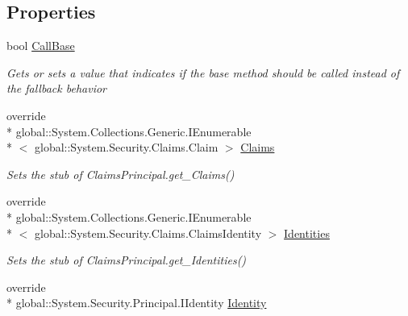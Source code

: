 \subsection*{Properties}
\begin{DoxyCompactItemize}
\item 
bool \hyperlink{class_system_1_1_security_1_1_principal_1_1_fakes_1_1_stub_generic_principal_a1cc5d2a168bacab0838acd6a0ab4c05a}{Call\-Base}
\begin{DoxyCompactList}\small\item\em Gets or sets a value that indicates if the base method should be called instead of the fallback behavior\end{DoxyCompactList}\item 
override \\*
global\-::\-System.\-Collections.\-Generic.\-I\-Enumerable\\*
$<$ global\-::\-System.\-Security.\-Claims.\-Claim $>$ \hyperlink{class_system_1_1_security_1_1_principal_1_1_fakes_1_1_stub_generic_principal_a92a1907781448b8b384757b05f8ab33b}{Claims}
\begin{DoxyCompactList}\small\item\em Sets the stub of Claims\-Principal.\-get\-\_\-\-Claims()\end{DoxyCompactList}\item 
override \\*
global\-::\-System.\-Collections.\-Generic.\-I\-Enumerable\\*
$<$ global\-::\-System.\-Security.\-Claims.\-Claims\-Identity $>$ \hyperlink{class_system_1_1_security_1_1_principal_1_1_fakes_1_1_stub_generic_principal_ab0ecdb9d7b23eb08c92d20cebbea194e}{Identities}
\begin{DoxyCompactList}\small\item\em Sets the stub of Claims\-Principal.\-get\-\_\-\-Identities()\end{DoxyCompactList}\item 
override \\*
global\-::\-System.\-Security.\-Principal.\-I\-Identity \hyperlink{class_system_1_1_security_1_1_principal_1_1_fakes_1_1_stub_generic_principal_a859534934e3f9da0113339af16b6e501}{Identity}

\end{DoxyCompactItemize}
